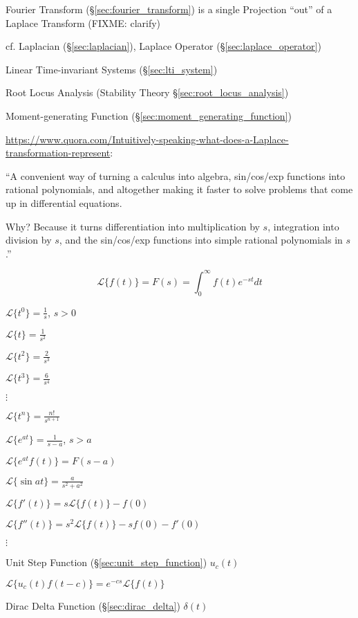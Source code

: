\fist Fourier Transform (\S\ref{sec:fourier_transform}) is a single Projection
``out'' of a Laplace Transform (FIXME: clarify)

\fist cf. Laplacian (\S\ref{sec:laplacian}), Laplace Operator
(\S\ref{sec:laplace_operator}) %

\fist Linear Time-invariant Systems (\S\ref{sec:lti_system})

\fist Root Locus Analysis (Stability Theory \S\ref{sec:root_locus_analysis})

\fist Moment-generating Function (\S\ref{sec:moment_generating_function})

\url{https://www.quora.com/Intuitively-speaking-what-does-a-Laplace-transformation-represent}:

``A convenient way of turning a calculus into algebra, sin/cos/exp functions
into rational polynomials, and altogether making it faster to solve problems
that come up in differential equations.

Why? Because it turns differentiation into multiplication by $s$, integration
into division by $s$, and the sin/cos/exp functions into simple rational
polynomials in $s$.''

\[
  \mathcal{L} \{ f(t) \} = F(s) = \int_0^\infty f(t) e^{-st} dt
\]

$\mathcal{L}\{t^0\} = \frac{1}{s}$, $s > 0$

$\mathcal{L}\{t\} = \frac{1}{s^2}$

$\mathcal{L}\{t^2\} = \frac{2}{s^3}$

$\mathcal{L}\{t^3\} = \frac{6}{s^4}$

$\vdots$

$\mathcal{L}\{t^n\} = \frac{n!}{s^{n+1}}$

$\mathcal{L}\{e^{at}\} = \frac{1}{s-a}$, $s > a$

$\mathcal{L}\{e^{at}f(t)\} = F(s-a)$

$\mathcal{L}\{\sin at\} = \frac{a}{s^2+a^2}$

$\mathcal{L}\{ f'(t) \} = s \mathcal{L} \{f(t)\} - f(0)$

$\mathcal{L}\{ f''(t) \} = s^2 \mathcal{L} \{f(t)\} - sf(0) - f'(0)$

$\vdots$

Unit Step Function (\S\ref{sec:unit_step_function}) $u_c(t)$

$\mathcal{L}\{ u_c(t)f(t-c) \} = e^{-cs}\mathcal{L}\{f(t)\}$

Dirac Delta Function (\S\ref{sec:dirac_delta}) $\delta(t)$

